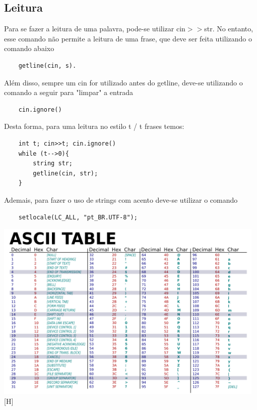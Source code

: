 \subsection{Leitura}
Para se fazer a leitura de uma palavra, pode-se utilizar cin$>>$str. No entanto, 
esse comando não permite a leitura de uma frase, que deve ser feita utilizando 
o comando abaixo
\begin{verbatim}
    getline(cin, s).
\end{verbatim}
Além disso, sempre um cin for utilizado antes do getline, deve-se utilizando o comando
a seguir para "limpar" a entrada
\begin{verbatim}
    cin.ignore()
\end{verbatim}
Desta forma, para uma leitura no estilo t / t frases temos:
\begin{verbatim}
    int t; cin>>t; cin.ignore()
    while (t-->0){
        string str;
        getline(cin, str);
    }
\end{verbatim}
Ademais, para fazer o uso de strings com acento deve-se utilizar o comando
\begin{verbatim}
    setlocale(LC_ALL, "pt_BR.UTF-8");
\end{verbatim}

\includegraphics[width=130mm]{6_strings/ASCII.png}[H]
\pagebreak

